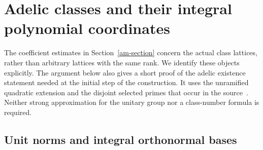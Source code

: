 \section{Adelic classes and their integral polynomial coordinates}
\label{acl-section}

The coefficient estimates in Section~\ref{am-section} concern the
actual class lattices, rather than arbitrary lattices with the same
rank. We identify these objects explicitly. The argument below also
gives a short proof of the adelic existence statement needed at the
initial step of the construction. It uses the unramified quadratic
extension and the disjoint selected primes that occur in the
source~\cite{alpo-uniform-source}. Neither strong approximation for
the unitary group nor a class-number formula is required.

\subsection{Unit norms and integral orthonormal bases}

